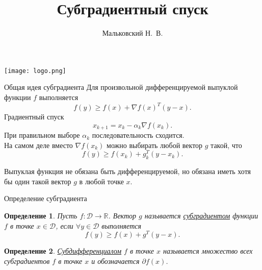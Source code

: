 \documentclass[10pt, handout]{beamer}
\author{Мальковский Н.~В.}
\title[Субградиентный спуск]{Субградиентный спуск}
\institute[СПбAУ]{Санкт-Петербургский академический университет}
\date{}
\newtheorem{definition_ru}{Определение}[]
\begin{document}
\begin{frame}
\titlepage
\centering
\texttt{[image: logo.png]}
\end{frame}


\begin{frame}{Общая идея субградиента}
Для произвольной дифференцируемой выпуклой функции $f$ выполняется
$$
f(y)\geq f(x)+\nabla f(x)^T(y-x).
$$
\pause
Градиентный спуск
$$
x_{k+1}=x_k-\alpha_k\nabla f(x_k).
$$
При правильном выборе $\alpha_k$ последовательность сходится.\\
\vspace{1cm}
\pause
На самом деле вместо $\nabla f(x_k)$ можно выбирать любой вектор $g$ такой, что
$$
f(y)\geq f(x_k)+g_k^T(y-x_k).
$$
\pause

Выпуклая функция не обязана быть дифференцируемой, но обязана иметь хотя бы один такой
вектор $g$ в любой точке $x$. 
\end{frame}

\begin{frame}{Определение субградиента}
\begin{definition_ru}
Пусть $f:\mathcal{D}\rightarrow \mathbb{R}$. Вектор $g$ называется \underline{субградиентом} функции $f$ в точке $x\in\mathcal{D}$, если $\forall y
\in \mathcal{D}$ выполняется
$$
f(y)\geq f(x)+g^T(y-x).
$$ 
\end{definition_ru}
\begin{definition_ru}
\underline{Субдифференциалом} $f$ в точке $x$ называется множество всех субградиентов $f$ в точке $x$ и обозначается $\partial f(x)$.
\end{definition_ru}
\end{frame}
\end{document}
